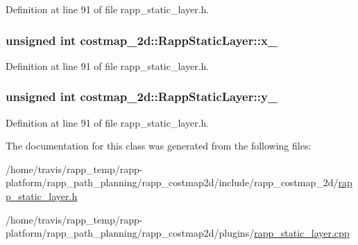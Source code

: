 Definition at line 91 of file rapp\-\_\-static\-\_\-layer.\-h.

\hypertarget{classcostmap__2d_1_1RappStaticLayer_a14718147c9334c14efea1aa845f7f650}{
\subsubsection[{x\-\_\-}]{\setlength{\rightskip}{0pt plus 5cm}unsigned int costmap\-\_\-2d\-::\-Rapp\-Static\-Layer\-::x\-\_\-\hspace{0.3cm}{\ttfamily [private]}}}\label{classcostmap__2d_1_1RappStaticLayer_a14718147c9334c14efea1aa845f7f650}


Definition at line 91 of file rapp\-\_\-static\-\_\-layer.\-h.

\hypertarget{classcostmap__2d_1_1RappStaticLayer_a3cebcf2d60339655080a13cd4c4719d7}{
\subsubsection[{y\-\_\-}]{\setlength{\rightskip}{0pt plus 5cm}unsigned int costmap\-\_\-2d\-::\-Rapp\-Static\-Layer\-::y\-\_\-\hspace{0.3cm}{\ttfamily [private]}}}\label{classcostmap__2d_1_1RappStaticLayer_a3cebcf2d60339655080a13cd4c4719d7}


Definition at line 91 of file rapp\-\_\-static\-\_\-layer.\-h.



The documentation for this class was generated from the following files\-:\begin{DoxyCompactItemize}
\item 
/home/travis/rapp\-\_\-temp/rapp-\/platform/rapp\-\_\-path\-\_\-planning/rapp\-\_\-costmap2d/include/rapp\-\_\-costmap\-\_\-2d/\hyperlink{rapp__static__layer_8h}{rapp\-\_\-static\-\_\-layer.\-h}\item 
/home/travis/rapp\-\_\-temp/rapp-\/platform/rapp\-\_\-path\-\_\-planning/rapp\-\_\-costmap2d/plugins/\hyperlink{rapp__static__layer_8cpp}{rapp\-\_\-static\-\_\-layer.\-cpp}\end{DoxyCompactItemize}
